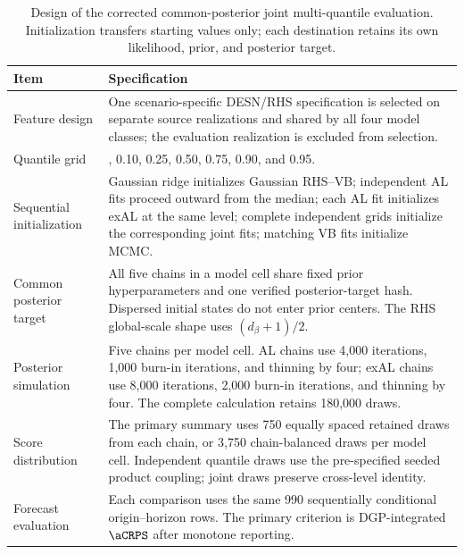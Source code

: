 \begin{table}[!htbp]
\centering
\small
\begin{tabular}{@{}>{\raggedright\arraybackslash}p{}>{\raggedright\arraybackslash}p{}@{}}
\toprule
Item & Specification \\
\midrule
Feature design & One scenario-specific DESN/RHS specification is selected on separate source realizations and shared by all four model classes; the evaluation realization is excluded from selection. \\
Quantile grid & 0.05, 0.10, 0.25, 0.50, 0.75, 0.90, and 0.95. \\
Sequential initialization & Gaussian ridge initializes Gaussian RHS--VB; independent AL fits proceed outward from the median; each AL fit initializes exAL at the same level; complete independent grids initialize the corresponding joint fits; matching VB fits initialize MCMC. \\
Common posterior target & All five chains in a model cell share fixed prior hyperparameters and one verified posterior-target hash. Dispersed initial states do not enter prior centers. The RHS global-scale shape uses \((d_\beta+1)/2\). \\
Posterior simulation & Five chains per model cell. AL chains use 4,000 iterations, 1,000 burn-in iterations, and thinning by four; exAL chains use 8,000 iterations, 2,000 burn-in iterations, and thinning by four. The complete calculation retains 180,000 draws. \\
Score distribution & The primary summary uses 750 equally spaced retained draws from each chain, or 3,750 chain-balanced draws per model cell. Independent quantile draws use the pre-specified seeded product coupling; joint draws preserve cross-level identity. \\
Forecast evaluation & Each comparison uses the same 990 sequentially conditional origin--horizon rows. The primary criterion is DGP-integrated \(\aCRPS\) after monotone reporting. \\
\bottomrule
\end{tabular}
\caption{Design of the corrected common-posterior joint multi-quantile evaluation. Initialization transfers starting values only; each destination retains its own likelihood, prior, and posterior target.}
\label{tab:joint-qdesn-corrected-v4-protocol}
\end{table}
